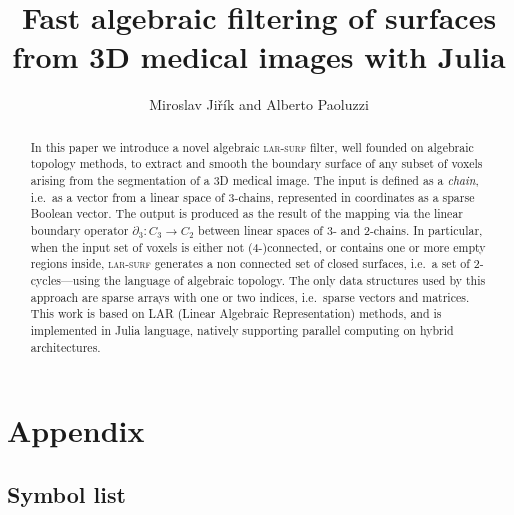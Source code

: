 \documentclass[11pt, oneside]{article}   	%
\title{Fast algebraic filtering of surfaces from 3D medical images with Julia}
\author{Miroslav Ji\v{r}\'ik and Alberto Paoluzzi}
\date{}							%
\begin{document}
\maketitle

\begin{abstract}
In this paper we introduce a novel algebraic \textsc{lar-surf} filter, well founded on algebraic topology methods, to extract and smooth the boundary surface of any subset of voxels arising from the segmentation of a 3D medical image. The input is defined as a \emph{chain}, i.e.~as a vector from a linear space of 3-chains, represented in coordinates as a sparse Boolean vector. The output is produced as the result of the mapping via the linear boundary operator $\partial_3:C_3 \to C_2$ between linear spaces of 3- and 2-chains.  In particular, when the input set of voxels is either not (4-)connected, or contains one or more empty regions inside, \textsc{lar-surf} generates a non connected set of closed surfaces, i.e.~a set of 2-cycles---using the language of algebraic topology. The only data structures used by this approach are sparse arrays with one or two indices, i.e.~sparse vectors and matrices. This work is based on LAR (Linear Algebraic Representation) methods, and is implemented in Julia language, natively supporting parallel computing on hybrid architectures.
\end{abstract}

\tableofcontents











\appendix
\section{Appendix}
\subsection{Symbol list}
\end{document}
